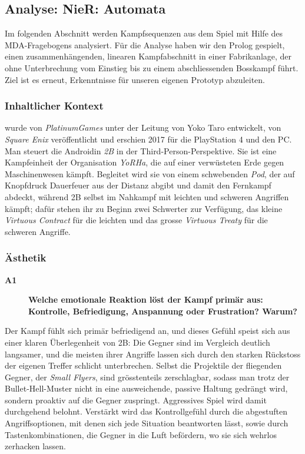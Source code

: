\documentclass[../Main.tex]{subfiles}
\begin{document}
\subsection{Analyse: NieR: Automata} \label{sec:ReferenzspielanalyseNier}

Im folgenden Abschnitt werden Kampfsequenzen aus dem Spiel  mit Hilfe des MDA-Fragebogens analysiert. Für die Analyse haben wir den Prolog gespielt, einen zusammenhängenden, linearen Kampfabschnitt in einer Fabrikanlage, der ohne Unterbrechung vom Einstieg bis zu einem abschliessenden Bosskampf führt. Ziel ist es erneut, Erkenntnisse für unseren eigenen Prototyp abzuleiten.

\subsubsection{Inhaltlicher Kontext}

 wurde von \textit{PlatinumGames} unter der Leitung von Yoko Taro entwickelt, von \textit{Square Enix} veröffentlicht und erschien 2017 für die PlayStation 4 und den PC.\autocite{wikipedia_nierautomata} Man steuert die Androidin \textit{2B} in der Third-Person-Perspektive. Sie ist eine Kampfeinheit der Organisation \textit{YoRHa}, die auf einer verwüsteten Erde gegen Maschinenwesen kämpft. Begleitet wird sie von einem schwebenden \textit{Pod}, der auf Knopfdruck Dauerfeuer aus der Distanz abgibt und damit den Fernkampf abdeckt, während 2B selbst im Nahkampf mit leichten und schweren Angriffen kämpft; dafür stehen ihr zu Beginn zwei Schwerter zur Verfügung, das kleine \textit{Virtuous Contract} für die leichten und das grosse \textit{Virtuous Treaty} für die schweren Angriffe.

\subsubsection{Ästhetik}

\begin{description}
    \item[\textbf{A1}] \textbf{Welche emotionale Reaktion löst der Kampf primär aus: Kontrolle, Befriedigung, Anspannung oder Frustration? Warum?}
\end{description}

Der Kampf fühlt sich primär befriedigend an, und dieses Gefühl speist sich aus einer klaren Überlegenheit von 2B: Die Gegner sind im Vergleich deutlich langsamer, und die meisten ihrer Angriffe lassen sich durch den starken Rückstoss der eigenen Treffer schlicht unterbrechen. Selbst die Projektile der fliegenden Gegner, der \textit{Small Flyers}, sind grösstenteils zerschlagbar, sodass man trotz der Bullet-Hell-Muster nicht in eine ausweichende, passive Haltung gedrängt wird, sondern proaktiv auf die Gegner zuspringt. Aggressives Spiel wird damit durchgehend belohnt. Verstärkt wird das Kontrollgefühl durch die abgestuften Angriffsoptionen, mit denen sich jede Situation beantworten lässt, sowie durch Tastenkombinationen, die Gegner in die Luft befördern, wo sie sich wehrlos zerhacken lassen.
\end{document}
